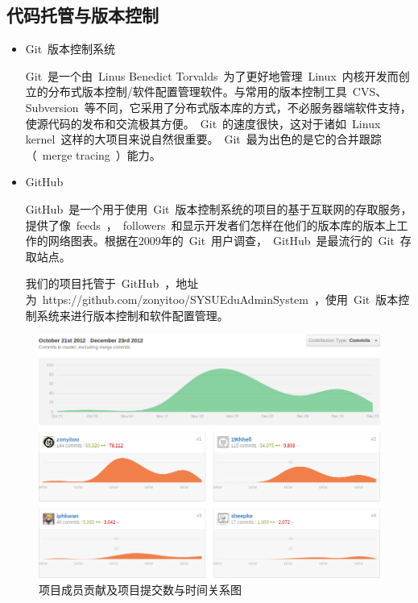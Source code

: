 
\subsection{代码托管与版本控制}
\begin{itemize}
  \item Git~版本控制系统
  
  \CJKindent Git~是一个由~Linus Benedict Torvalds~为了更好地管理~Linux~内核开发而创立的分布式版本控制/软件配置管理软件。与常用的版本控制工具~CVS、Subversion~等不同，它采用了分布式版本库的方式，不必服务器端软件支持，使源代码的发布和交流极其方便。~Git~的速度很快，这对于诸如~Linux kernel~这样的大项目来说自然很重要。~Git~最为出色的是它的合并跟踪（~merge tracing~）能力。
  
  \item GitHub
  
  \CJKindent GitHub~是一个用于使用~Git~版本控制系统的项目的基于互联网的存取服务，提供了像~feeds~，~followers~和显示开发者们怎样在他们的版本库的版本上工作的网络图表。根据在2009年的~Git~用户调查，~GitHub~是最流行的~Git~存取站点。
  
  \CJKindent 我们的项目托管于~GitHub~，地址为~https://github.com/zonyitoo/SYSUEduAdminSystem~，使用~Git~版本控制系统来进行版本控制和软件配置管理。
\end{itemize}

\begin{figure}[H]
   \centering \includegraphics[width=\textwidth]{img/contrib.png}
   \caption{项目成员贡献及项目提交数与时间关系图}
\end{figure}

